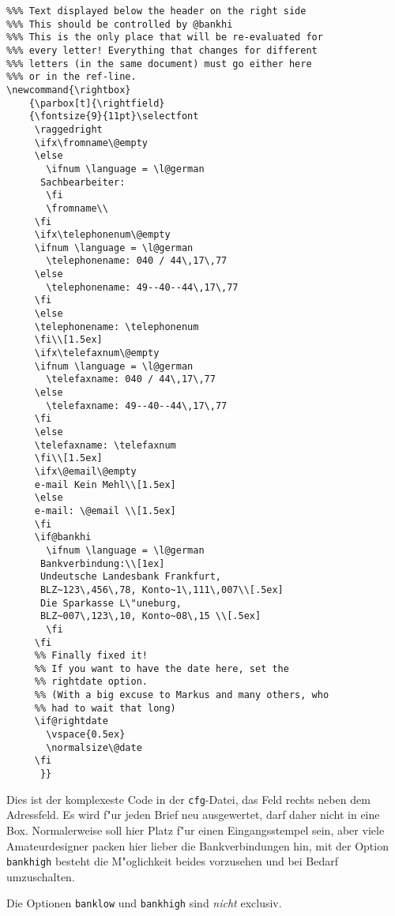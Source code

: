 \documentclass[a4paper]{article}
\begin{document}
\begin{verbatim}
%%% Text displayed below the header on the right side
%%% This should be controlled by @bankhi
%%% This is the only place that will be re-evaluated for
%%% every letter! Everything that changes for different
%%% letters (in the same document) must go either here
%%% or in the ref-line.
\newcommand{\rightbox}
    {\parbox[t]{\rightfield}
    {\fontsize{9}{11pt}\selectfont
     \raggedright
     \ifx\fromname\@empty
     \else
       \ifnum \language = \l@german
	  Sachbearbeiter:
       \fi
       \fromname\\
     \fi
     \ifx\telephonenum\@empty
	 \ifnum \language = \l@german
	   \telephonename: 040 / 44\,17\,77
	 \else
	   \telephonename: 49--40--44\,17\,77
	 \fi
     \else
	 \telephonename: \telephonenum
     \fi\\[1.5ex]
     \ifx\telefaxnum\@empty
	 \ifnum \language = \l@german
	   \telefaxname: 040 / 44\,17\,77
	 \else
	   \telefaxname: 49--40--44\,17\,77
	 \fi
     \else
	 \telefaxname: \telefaxnum
     \fi\\[1.5ex]
     \ifx\@email\@empty
	 e-mail Kein Mehl\\[1.5ex]
     \else
	 e-mail: \@email \\[1.5ex]
     \fi
     \if@bankhi
       \ifnum \language = \l@german
	  Bankverbindung:\\[1ex]
	  Undeutsche Landesbank Frankfurt,
	  BLZ~123\,456\,78, Konto~1\,111\,007\\[.5ex]
	  Die Sparkasse L\"uneburg,
	  BLZ~007\,123\,10, Konto~08\,15 \\[.5ex]
       \fi
     \fi
     %% Finally fixed it!
     %% If you want to have the date here, set the
     %% rightdate option.
     %% (With a big excuse to Markus and many others, who
     %% had to wait that long)
     \if@rightdate
       \vspace{0.5ex}
       \normalsize\@date
     \fi    
      }}
\end{verbatim}

Dies ist der komplexeste Code in der \texttt{cfg}-Datei, das 
Feld rechts neben dem Adressfeld. Es wird f"ur jeden Brief neu 
ausgewertet, darf daher nicht in eine Box. Normalerweise soll 
hier Platz f"ur einen Eingangsstempel sein, aber viele 
Amateurdesigner packen hier lieber die Bankverbindungen hin, mit 
der Option \texttt{bankhigh} besteht die M"oglichkeit beides 
vorzusehen und bei Bedarf umzuschalten.

Die Optionen \texttt{banklow} und \texttt{bankhigh} sind \emph{nicht} 
exclusiv.
\end{document}
